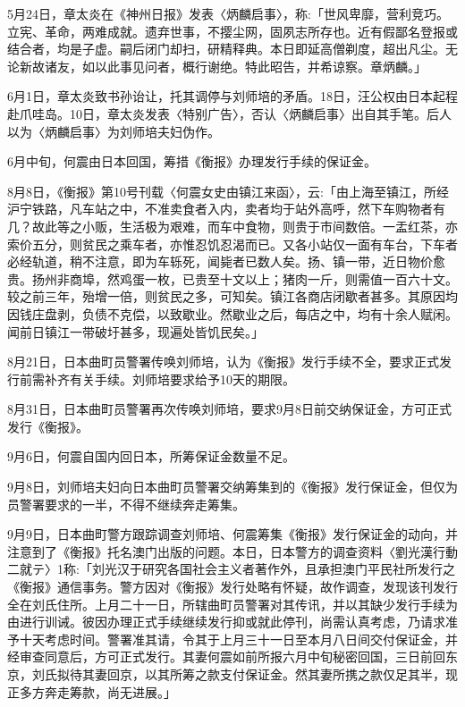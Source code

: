 5月24日，章太炎在《神州日报》发表〈炳麟启事〉，称:「世风卑靡，营利竞巧。立宪、革命，两难成就。遗弃世事，不撄尘网，固夙志所存也。近有假鄙名登报或结合者，均是子虚。嗣后闭门却扫，研精释典。本日即延高僧剃度，超出凡尘。无论新故诸友，如以此事见问者，概行谢绝。特此昭告，并希谅察。章炳麟。」

6月1日，章太炎致书孙诒让，托其调停与刘师培的矛盾。18日，汪公权由日本起程赴爪哇岛。10日，章太炎发表〈特别广告〉，否认〈炳麟启事〉出自其手笔。后人以为〈炳麟启事〉为刘师培夫妇伪作。

6月中旬，何震由日本回国，筹措《衡报》办理发行手续的保证金。

8月8日，《衡报》第10号刊载〈何震女史由镇江来函〉，云:「由上海至镇江，所经沪宁铁路，凡车站之中，不准卖食者入内，卖者均于站外高呼，然下车购物者有几？故此等之小贩，生活极为艰难，而车中食物，则贵于市间数倍。一盂红茶，亦索价五分，则贫民之乘车者，亦惟忍饥忍渴而已。又各小站仅一面有车台，下车者必经轨道，稍不注意，即为车轹死，闻毙者已数人矣。扬、镇一带，近日物价愈贵。扬州非商埠，然鸡蛋一枚，已贵至十文以上；猪肉一斤，则需值一百六十文。较之前三年，殆增一倍，则贫民之多，可知矣。镇江各商店闭歇者甚多。其原因均因钱庄盘剥，负债不克偿，以致歇业。然歇业之后，每店之中，均有十余人赋闲。闻前日镇江一带破圩甚多，现遍处皆饥民矣。」

8月21日，日本曲町员警署传唤刘师培，认为《衡报》发行手续不全，要求正式发行前需补齐有关手续。刘师培要求给予10天的期限。

8月31日，日本曲町员警署再次传唤刘师培，要求9月8日前交纳保证金，方可正式发行《衡报》。


9月6日，何震自国内回日本，所筹保证金数量不足。

9月8日，刘师培夫妇向日本曲町员警署交纳筹集到的《衡报》发行保证金，但仅为员警署要求的一半，不得不继续奔走筹集。

9月9日，日本曲町警方跟踪调查刘师培、何震筹集《衡报》发行保证金的动向，并注意到了《衡报》托名澳门出版的问题。本日，日本警方的调查资料〈劉光漢行動二就テ〉1称:「刘光汉于研究各国社会主义者著作外，且承担澳门平民社所发行之《衡报》通信事务。警方因对《衡报》发行处略有怀疑，故作调查，发现该刊发行全在刘氏住所。上月二十一日，所辖曲町员警署对其传讯，并以其缺少发行手续为由进行训诫。彼因办理正式手续继续发行抑或就此停刊，尚需认真考虑，乃请求准予十天考虑时间。警署准其请，令其于上月三十一日至本月八日间交付保证金，并经审查同意后，方可正式发行。其妻何震如前所报六月中旬秘密回国，三日前回东京，刘氏拟待其妻回京，以其所筹之款支付保证金。然其妻所携之款仅足其半，现正多方奔走筹款，尚无进展。」

